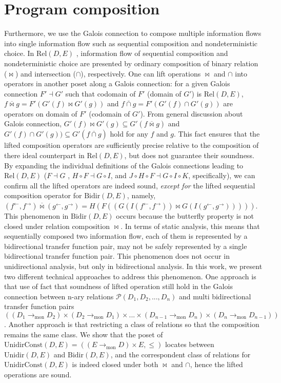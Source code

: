 \documentclass{easychair}
\theoremstyle{definition}
\newcommand{\Pow}{\mathcal{P}}
\newcommand{\Rel}{\mathrm{Rel}}
\newcommand{\Bidir}{\mathrm{Bidir}}
\newcommand{\Unidir}{\mathrm{Unidir}}
\newcommand{\UnidirConst}{\mathrm{UnidirConst}}
\newcommand{\tomon}{\to_{\mathrm{mon}}}
\newcommand{\ff}{{f^{\rightarrow}}}
\newcommand{\fb}{{f^{\leftarrow}}}
\newcommand{\gf}{{g^{\rightarrow}}}
\newcommand{\gb}{{g^{\leftarrow}}}
\newcommand{\comp}{\circ}
\newcommand{\bowtielift}{\mathbin{\overline{\bowtie}}}
\newcommand{\caplift}{\mathbin{\overline{\cap}}}
\begin{document}
\section{Program composition}
Furthermore, we use the Galois connection to compose multiple information flows into single
information flow such as sequential composition and nondeterministic choice. In $\Rel(D, E)$ ,
information flow of sequential composition and nondeterministic choice are presented by ordinary composition of binary relation ($\bowtie$) and intersection ($\cap$), respectively. One can lift operations $\bowtie$ and $\cap$
into operators in another poset along a Galois connection: for a given Galois connection $F' \dashv G'$ such that codomain of $F'$ (domain of $G'$) is $\Rel(D, E)$, $f \bowtielift g = F'(G'(f) \bowtie G'(g))$ and $f \caplift g = F'(G'(f) \cap G'(g))$ are operators on domain of $F'$ (codomain of $G'$).
From general discussion about Galois connection,
$G'(f) \bowtie G'(g) \subseteq G' (f \bowtielift g)$ and $G'(f) \cap G'(g)) \subseteq G'(f \caplift g)$ hold for any $f$ and $g$.
This fact ensures that the lifted composition operators are sufficiently precise relative to the composition of there ideal counterpart in $\Rel(D, E)$, but does not guarantee their soundness.
By expanding the individual definitions of the Galois connections leading to $\Rel(D ,E)$ ($F \dashv G$ , $H \comp F \dashv G \comp I$, and $J \comp H \comp F \dashv G \comp I \comp K$, specifically), we can confirm all the lifted operators are indeed sound, \emph{except for} the lifted sequential composition operator for $\Bidir(D, E)$, namely, $(\fb , \ff) \bowtielift (\gb , \gf) = H(F((G(I(\fb , \ff)) \bowtie G(I(\gb , \gf)))))$. This phenomenon in $\Bidir(D, E)$ occurs because the butterfly property is not closed under relation composition $\bowtie$.
In terms of static analysis, this means that sequentially composed two information flow, each of them is represented by a bidirectional transfer function pair, may not be safely represented by a single bidirectional transfer function pair. This phenomenon does not occur in unidirectional analysis, but only in bidirectional analysis.
In this work, we present two different technical approaches to address this phenomenon.
One approach is that use of fact that soundness of lifted operation still hold in the Galois connection between n-ary relations $\Pow(D_{1}, D_{2}, ... , D_{n})$ and multi bidirectional transfer function pairs $((D_{1} \tomon D_{2}) \times (D_{2} \tomon D_{1}) \times ... \times (D_{n-1} \tomon D_{n}) \times (D_{n} \tomon D_{n-1}))$.
Another approach is that restricting a class of relations so that the composition remains the same class. We show that the poset of $\UnidirConst(D, E) = ((E \tomon D) \times E, \leq)$ locates between $\Unidir(D , E)$ and $\Bidir(D, E)$, and the correspondent class of relations for $\UnidirConst(D, E)$ is indeed closed under both $\bowtie$ and $\cap$, hence the lifted operations are sound.



\end{document}
